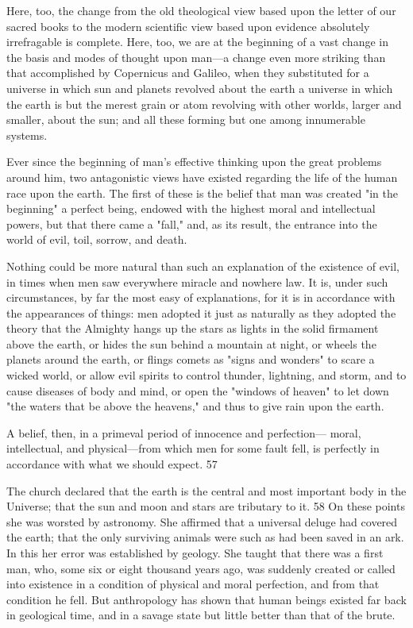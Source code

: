 Here, too, the change from the old theological view based upon the letter of our sacred books
to the modern scientific view based upon evidence absolutely irrefragable is complete. Here,
too, we are at the beginning of a vast change in the basis and modes of thought upon man—a
change even more striking than that accomplished by Copernicus and Galileo, when they
substituted for a universe in which sun and planets revolved about the earth a universe in
which the earth is but the merest grain or atom revolving with other worlds, larger and
smaller, about the sun; and all these forming but one among innumerable systems.

Ever since the beginning of man's effective thinking upon the great problems around him,
two antagonistic views have existed regarding the life of the human race upon the earth. The
first of these is the belief that man was created "in the beginning" a perfect being, endowed
with the highest moral and intellectual powers, but that there came a "fall," and, as its result,
the entrance into the world of evil, toil, sorrow, and death.

Nothing could be more natural than such an explanation of the existence of evil, in times
when men saw everywhere miracle and nowhere law. It is, under such circumstances, by far
the most easy of explanations, for it is in accordance with the appearances of things: men
adopted it just as naturally as they adopted the theory that the Almighty hangs up the stars as
lights in the solid firmament above the earth, or hides the sun behind a mountain at night, or
wheels the planets around the earth, or flings comets as "signs and wonders" to scare a
wicked world, or allow evil spirits to control thunder, lightning, and storm, and to cause
diseases of body and mind, or open the "windows of heaven" to let down "the waters that be
above the heavens," and thus to give rain upon the earth.

A belief, then, in a primeval period of innocence and perfection— moral, intellectual, and
physical—from which men for some fault fell, is perfectly in accordance with what we
should expect. 57

The church declared that the earth is the central and most important body in the Universe;
that the sun and moon and stars are tributary to it. 58 On these points she was worsted by
astronomy. She affirmed that a universal deluge had covered the earth; that the only
surviving animals were such as had been saved in an ark. In this her error was established by
geology. She taught that there was a first man, who, some six or eight thousand years ago,
was suddenly created or called into existence in a condition of physical and moral perfection,
and from that condition he fell. But anthropology has shown that human beings existed far
back in geological time, and in a savage state but little better than that of the brute.

